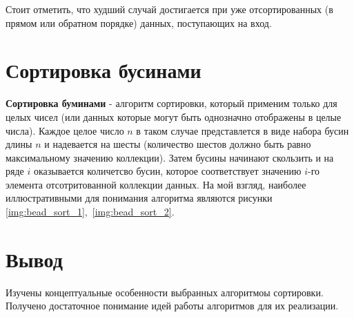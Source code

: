 Стоит отметить, что худший случай достигается при уже отсортированных (в прямом
или обратном порядке) данных, поступающих на вход.

\section{Сортировка бусинами}

\textbf{Сортировка буминами}\cite{select} - алгоритм сортировки, который
применим только для целых чисел (или данных которые могут быть однозначно
отображены в целые числа). Каждое целое число $n$ в таком случае представлется в
виде набора бусин длины $n$ и надевается на шесты (количество шестов должно
быть равно максимальному значению коллекции). Затем бусины начинают скользить
и на ряде $i$ оказывается количетсво бусин, которое соответствует
значению $i$-го элемента отсотритованной коллекции данных. На мой взгляд,
наиболее иллюстративными для понимания алгоритма являются рисунки
\ref{img:bead_sort_1},~\ref{img:bead_sort_2}.



\section*{Вывод}

Изучены концептуальные особенности выбранных алгоритмоы сортировки. Получено
достаточное понимание идей работы алгоритмов для их реализации.
